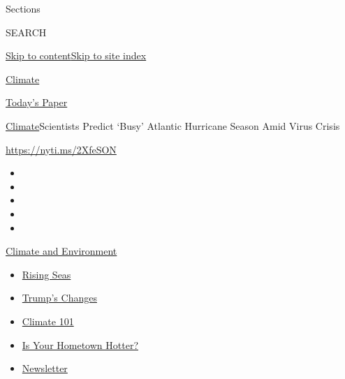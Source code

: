 Sections

SEARCH

\protect\hyperlink{site-content}{Skip to
content}\protect\hyperlink{site-index}{Skip to site index}

\href{https://www.nytimes3xbfgragh.onion/section/climate}{Climate}

\href{https://myaccount.nytimes3xbfgragh.onion/auth/login?response_type=cookie\&client_id=vi}{}

\href{https://www.nytimes3xbfgragh.onion/section/todayspaper}{Today's
Paper}

\href{/section/climate}{Climate}\textbar{}Scientists Predict `Busy'
Atlantic Hurricane Season Amid Virus Crisis

\url{https://nyti.ms/2XfeSON}

\begin{itemize}
\item
\item
\item
\item
\item
\end{itemize}

\href{https://www.nytimes3xbfgragh.onion/section/climate?action=click\&pgtype=Article\&state=default\&region=TOP_BANNER\&context=storylines_menu}{Climate
and Environment}

\begin{itemize}
\tightlist
\item
  \href{https://www.nytimes3xbfgragh.onion/2020/07/30/climate/sea-level-inland-floods.html?action=click\&pgtype=Article\&state=default\&region=TOP_BANNER\&context=storylines_menu}{Rising
  Seas}
\item
  \href{https://www.nytimes3xbfgragh.onion/interactive/2020/climate/trump-environment-rollbacks.html?action=click\&pgtype=Article\&state=default\&region=TOP_BANNER\&context=storylines_menu}{Trump's
  Changes}
\item
  \href{https://www.nytimes3xbfgragh.onion/interactive/2020/04/19/climate/climate-crash-course-1.html?action=click\&pgtype=Article\&state=default\&region=TOP_BANNER\&context=storylines_menu}{Climate
  101}
\item
  \href{https://www.nytimes3xbfgragh.onion/interactive/2018/08/30/climate/how-much-hotter-is-your-hometown.html?action=click\&pgtype=Article\&state=default\&region=TOP_BANNER\&context=storylines_menu}{Is
  Your Hometown Hotter?}
\item
  \href{https://www.nytimes3xbfgragh.onion/newsletters/climate-change?action=click\&pgtype=Article\&state=default\&region=TOP_BANNER\&context=storylines_menu}{Newsletter}
\end{itemize}

